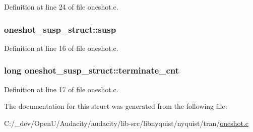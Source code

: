 Definition at line 24 of file oneshot.\+c.

\subsubsection[{\texorpdfstring{susp}{susp}}]{ oneshot\+\_\+susp\+\_\+struct\+::susp}\hypertarget{structoneshot__susp__struct_a3775aee003e84f341e975a5154242046}{}\label{structoneshot__susp__struct_a3775aee003e84f341e975a5154242046}


Definition at line 16 of file oneshot.\+c.

\subsubsection[{\texorpdfstring{terminate\+\_\+cnt}{terminate_cnt}}]{\setlength{\rightskip}{0pt plus 5cm}long oneshot\+\_\+susp\+\_\+struct\+::terminate\+\_\+cnt}\hypertarget{structoneshot__susp__struct_ae423b9489d49a8c4dc7df2dfedb83b2d}{}\label{structoneshot__susp__struct_ae423b9489d49a8c4dc7df2dfedb83b2d}


Definition at line 17 of file oneshot.\+c.



The documentation for this struct was generated from the following file\+:\begin{DoxyCompactItemize}
\item 
C\+:/\+\_\+dev/\+Open\+U/\+Audacity/audacity/lib-\/src/libnyquist/nyquist/tran/\hyperlink{oneshot_8c}{oneshot.\+c}\end{DoxyCompactItemize}
